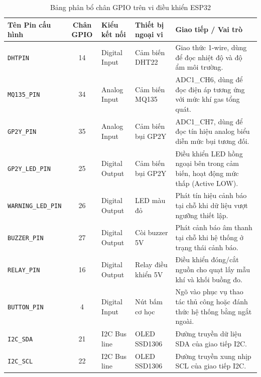 \begin{table}[H]
\centering
\caption{Bảng phân bổ chân GPIO trên vi điều khiển ESP32}
\label{tab:gpioallocation}
\footnotesize
\renewcommand{\arraystretch}{1.35}
\setlength{\tabcolsep}{4pt}

\begin{tabularx}{\textwidth}{|p{3.0cm}|c|p{2.5cm}|p{3.0cm}|X|}
\hline
\textbf{Tên Pin cấu hình} 
& \textbf{Chân GPIO} 
& \textbf{Kiểu kết nối} 
& \textbf{Thiết bị ngoại vi} 
& \textbf{Giao tiếp / Vai trò} \\
\hline

\texttt{DHTPIN} 
& 14 
& Digital Input 
& Cảm biến DHT22 
& Giao thức 1-wire, dùng để đọc nhiệt độ và độ ẩm môi trường. \\
\hline

\texttt{MQ135\_PIN} 
& 34 
& Analog Input 
& Cảm biến MQ135 
& ADC1\_CH6, dùng để đọc điện áp tương ứng với mức khí gas tổng quát. \\
\hline

\texttt{GP2Y\_PIN} 
& 35 
& Analog Input 
& Cảm biến bụi GP2Y 
& ADC1\_CH7, dùng để đọc tín hiệu analog biểu diễn mức bụi tương đối. \\
\hline

\texttt{GP2Y\_LED\_PIN} 
& 25 
& Digital Output 
& Cảm biến bụi GP2Y 
& Điều khiển LED hồng ngoại bên trong cảm biến, hoạt động mức thấp (Active LOW). \\
\hline

\texttt{WARNING\_LED\_PIN} 
& 26 
& Digital Output 
& LED màu đỏ 
& Phát tín hiệu cảnh báo tại chỗ khi dữ liệu vượt ngưỡng thiết lập. \\
\hline

\texttt{BUZZER\_PIN} 
& 27 
& Digital Output 
& Còi buzzer 5V 
& Phát cảnh báo âm thanh tại chỗ khi hệ thống ở trạng thái cảnh báo. \\
\hline

\texttt{RELAY\_PIN} 
& 16 
& Digital Output 
& Relay điều khiển 5V 
& Điều khiển đóng/cắt nguồn cho quạt lấy mẫu khí và khối buồng đo. \\
\hline

\texttt{BUTTON\_PIN} 
& 4 
& Digital Input 
& Nút bấm cơ học 
& Ngõ vào phục vụ thao tác thủ công hoặc đánh thức hệ thống bằng ngắt ngoài. \\
\hline

\texttt{I2C\_SDA} 
& 21 
& I2C Bus line 
& OLED SSD1306 
& Đường truyền dữ liệu SDA của giao tiếp I2C. \\
\hline

\texttt{I2C\_SCL} 
& 22 
& I2C Bus line 
& OLED SSD1306 
& Đường truyền xung nhịp SCL của giao tiếp I2C. \\
\hline

\end{tabularx}
\end{table}

